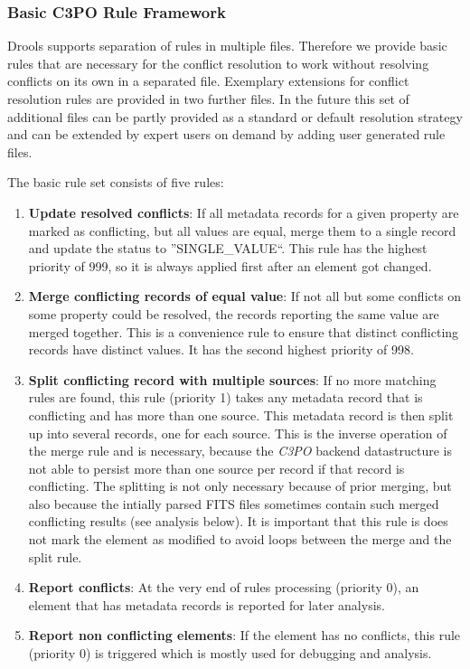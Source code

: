 \documentclass[a4paper,12pt]{article}
\begin{document}
\subsubsection{Basic C3PO Rule Framework}
Drools supports separation of rules in multiple files. Therefore we provide basic rules that are necessary for the conflict resolution to work without resolving conflicts on its own in a separated file. Exemplary extensions for conflict resolution rules are provided in two further files. In the future this set of additional files can be partly provided as a standard or default resolution strategy and can be extended by expert users on demand by adding user generated rule files.

The basic rule set consists of five rules:
\begin{enumerate}
 \item \textbf{Update resolved conflicts}: If all metadata records for a given property are marked as conflicting, but all values are equal, merge them to a single record and update the status to ''SINGLE\_VALUE``. This rule has the highest priority of 999, so it is always applied first after an element got changed.
 \item \textbf{Merge conflicting records of equal value}: If not all but some conflicts on some property could be resolved, the records reporting the same value are merged together. This is a convenience rule to ensure that distinct conflicting records have distinct values. It has the second highest priority of 998.
 \item \textbf{Split conflicting record with multiple sources}: If no more matching rules are found, this rule (priority 1) takes any metadata record that is conflicting and has more than one source. This metadata record is then split up into several records, one for each source. This is the inverse operation of the merge rule and is necessary, because the \emph{C3PO} backend datastructure is not able to persist more than one source per record if that record is conflicting. The splitting is not only necessary because of prior merging, but also because the intially parsed FITS files sometimes contain such merged conflicting results (see analysis below). It is important that this rule is does not mark the element as modified to avoid loops between the merge and the split rule.
 \item \textbf{Report conflicts}: At the very end of rules processing (priority 0), an element that has metadata records is reported for later analysis.
 \item \textbf{Report non conflicting elements}: If the element has no conflicts, this rule (priority 0) is triggered which is mostly used for debugging and analysis.
\end{enumerate}
\end{document}
